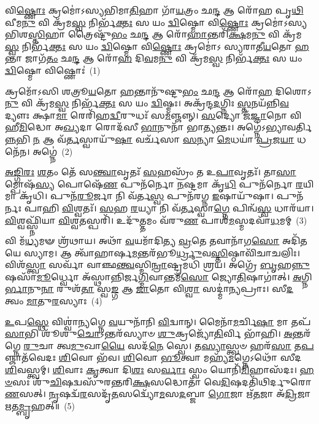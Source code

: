 \setcounter{anuvakam}{0}
𑌵𑌿\-\ul{𑌷𑍍𑌣𑍋𑌃} 𑌕𑍍𑌰𑌮𑍋॑\-𑌽𑌸𑍍𑌯𑌭𑌿𑌮𑌾\-\ul{𑌤𑌿}\-𑌹𑌾 𑌗𑌾᳴\-\ul{𑌯}\-𑌤𑍍𑌰𑌂 𑌛\-\ul{𑌨𑍍𑌦} 𑌆 𑌰𑍋᳴𑌹 𑌪𑍃\-\ul{𑌥𑌿}\-𑌵𑍀𑌮\-\ul{𑌨𑍁} 𑌵𑌿 𑌕𑍍𑌰᳴𑌮\-\ul{𑌸𑍍𑌵} 𑌨𑌿𑌰𑍍𑌭᳴\-\ul{𑌕𑍍𑌤𑌃} 𑌸 𑌯𑌂 \ul{𑌦𑍍𑌵𑌿}\-𑌷𑍍𑌮𑍋 𑌵𑌿\-\ul{𑌷𑍍𑌣𑍋𑌃} 𑌕𑍍𑌰𑌮𑍋॑\-𑌽𑌸𑍍𑌯𑌭𑌿𑌶\-\ul{𑌸𑍍𑌤𑌿}\-𑌹𑌾 𑌤𑍍𑌰𑍈𑌷𑍍𑌟𑍁᳴\-\ul{𑌭𑌂} 𑌛\-\ul{𑌨𑍍𑌦} 𑌆 𑌰𑍋᳴\-\ul{𑌹𑌾}\-𑌨𑍍𑌤𑌰𑌿᳴\-\ul{𑌕𑍍𑌷}\-𑌮\-\ul{𑌨𑍁} 𑌵𑌿 𑌕𑍍𑌰᳴𑌮\-\ul{𑌸𑍍𑌵} 𑌨𑌿𑌰𑍍𑌭᳴\-\ul{𑌕𑍍𑌤𑌃} 𑌸 𑌯𑌂 \ul{𑌦𑍍𑌵𑌿}\-𑌷𑍍𑌮𑍋 𑌵𑌿\-\ul{𑌷𑍍𑌣𑍋𑌃} 𑌕𑍍𑌰𑌮𑍋॑\-𑌽 𑌸𑍍𑌯𑌰𑌾𑌤𑍀\-\ul{𑌯}\-𑌤𑍋 \ul{𑌹}\-𑌨𑍍𑌤𑌾 𑌜𑌾𑌗᳴\-\ul{𑌤𑌂} 𑌛\-\ul{𑌨𑍍𑌦} 𑌆 𑌰𑍋᳴\-\ul{𑌹} 𑌦𑌿\-\ul{𑌵}\-𑌮\-\ul{𑌨𑍁} 𑌵𑌿 𑌕𑍍𑌰᳴𑌮\-\ul{𑌸𑍍𑌵} 𑌨𑌿𑌰𑍍𑌭᳴\-\ul{𑌕𑍍𑌤𑌃} 𑌸 𑌯𑌂 \ul{𑌦𑍍𑌵𑌿}\-𑌷𑍍𑌮𑍋 𑌵𑌿𑌷𑍍𑌣𑍋𑌃॑~(1)

𑌕𑍍𑌰𑌮𑍋᳴\-𑌽𑌸𑌿 𑌶𑌤𑍍𑌰𑍂\-\ul{𑌯}\-𑌤𑍋 \ul{𑌹}\-𑌨𑍍𑌤𑌾𑌨𑍁᳴𑌷𑍍𑌟𑍁\-\ul{𑌭𑌂} 𑌛\-\ul{𑌨𑍍𑌦} 𑌆 𑌰𑍋᳴\-\ul{𑌹} 𑌦𑌿𑌶𑍋\-𑌽\-\ul{𑌨𑍁} 𑌵𑌿 𑌕𑍍𑌰᳴𑌮\-\ul{𑌸𑍍𑌵} 𑌨𑌿𑌰𑍍𑌭᳴\-\ul{𑌕𑍍𑌤𑌃} 𑌸 𑌯𑌂 \ul{𑌦𑍍𑌵𑌿}\-𑌷𑍍𑌮𑌃। 𑌅𑌕𑍍𑌰᳴𑌨𑍍𑌦\-\ul{𑌦}\-𑌗𑍍𑌨𑌿𑌃 \ul{𑌸𑍍𑌤}\-𑌨𑌯᳴𑌨𑍍𑌨𑌿\-\ul{𑌵} 𑌦𑍍𑌯𑍗𑌃 𑌕𑍍𑌷𑌾\-\ul{𑌮𑌾} 𑌰𑍇𑌰𑌿᳴𑌹\-\ul{𑌦𑍍𑌵𑍀}\-𑌰𑍁𑌧𑌃᳴ 𑌸\-\ul{𑌮}\-𑌞𑍍𑌜𑌨𑍍𑌨𑍍। \ul{𑌸}\-𑌦𑍍𑌯𑍋 𑌜᳴\-\ul{𑌜𑍍𑌞𑌾}\-𑌨𑍋 𑌵𑌿 𑌹𑍀\-\ul{𑌮𑌿}\-𑌦𑍍𑌧𑍋 𑌅\-\ul{𑌖𑍍𑌯}\-𑌦𑌾 𑌰𑍋𑌦᳴𑌸𑍀 \ul{𑌭𑌾}\-𑌨𑍁𑌨𑌾᳴ 𑌭𑌾\-\ul{𑌤𑍍𑌯}\-𑌨𑍍𑌤𑌃। 𑌅𑌗𑍍𑌨𑍇॑\-𑌽𑌭𑍍𑌯𑌾𑌵𑌰𑍍𑌤𑌿\-\ul{𑌨𑍍𑌨}\-𑌭𑌿 \ul{𑌨} 𑌆 𑌵᳴\-\ul{𑌰𑍍𑌤}\-𑌸𑍍𑌵𑌾𑌯𑍁᳴\-\ul{𑌷𑌾} 𑌵𑌰𑍍𑌚᳴𑌸𑌾 \ul{𑌸}\-𑌨𑍍𑌯𑌾 \ul{𑌮𑍇}\-𑌧𑌯𑌾॑ \ul{𑌪𑍍𑌰}\-𑌜\-\ul{𑌯𑌾} 𑌧𑌨𑍇᳴𑌨। 𑌅𑌗𑍍𑌨𑍇॑~(2)

\-\ul{𑌅}\-\-\ul{𑌙𑍍𑌗𑌿}\-\-\ul{𑌰𑌃} \ul{𑌶}\-𑌤𑌂 𑌤𑍇᳴ 𑌸\-\ul{𑌨𑍍𑌤𑍍𑌵𑌾}\-𑌵𑍃𑌤𑌃᳴ \ul{𑌸}\-𑌹𑌸𑍍𑌰𑌂᳴ 𑌤 𑌉\-\ul{𑌪𑌾}\-𑌵𑍃𑌤𑌃᳴। 𑌤𑌾\-\ul{𑌸𑌾}\-𑌮𑍍𑌪𑍋𑌷᳴\-\ul{𑌸𑍍𑌯} 𑌪𑍋𑌷𑍇᳴\-\ul{𑌣} 𑌪𑍁𑌨᳴𑌰𑍍𑌨𑍋 \ul{𑌨}\-𑌷𑍍𑌟𑌮𑌾 𑌕𑍃᳴\-\ul{𑌧𑌿} 𑌪𑍁𑌨᳴𑌰𑍍𑌨𑍋 \ul{𑌰}\-𑌯𑌿𑌮𑌾 𑌕𑍃᳴𑌧𑌿। 𑌪𑍁𑌨᳴\-\ul{𑌰𑍂}\-𑌰𑍍𑌜𑌾 𑌨𑌿 𑌵᳴𑌰𑍍𑌤\-\ul{𑌸𑍍𑌵} 𑌪𑍁𑌨᳴𑌰𑌗𑍍𑌨 \ul{𑌇}\-𑌷𑌾𑌯𑍁᳴𑌷𑌾। 𑌪𑍁𑌨᳴𑌰𑍍𑌨𑌃 𑌪𑌾𑌹𑌿 \ul{𑌵𑌿}\-𑌶𑍍𑌵𑌤𑌃᳴। \ul{𑌸}\-𑌹 \ul{𑌰}\-𑌯𑍍𑌯𑌾 𑌨𑌿 𑌵᳴\-\ul{𑌰𑍍𑌤}\-𑌸𑍍𑌵𑌾\-\ul{𑌗𑍍𑌨𑍇} 𑌪𑌿𑌨𑍍𑌵᳴\-\ul{𑌸𑍍𑌵} 𑌧𑌾𑌰᳴𑌯𑌾। \ul{𑌵𑌿}\-𑌶𑍍𑌵𑌫𑍍𑌸𑍍𑌨𑌿᳴𑌯𑌾 \ul{𑌵𑌿}\-𑌶𑍍𑌵\-\ul{𑌤}\-𑌸𑍍𑌪𑌰𑌿᳴। 𑌉𑌦𑍁᳴\-\ul{𑌤𑍍𑌤}\-𑌮𑌂 𑌵᳴𑌰𑍁\-\ul{𑌣} 𑌪𑌾𑌶᳴\-\ul{𑌮}\-𑌸𑍍𑌮𑌦𑌵𑌾᳴\-\ul{𑌧}\-𑌮𑌮𑍍~(3)

𑌵𑌿 𑌮᳴\-\ul{𑌧𑍍𑌯}\-𑌮𑍟 𑌶𑍍𑌰᳴𑌥𑌾𑌯। 𑌅𑌥𑌾᳴ \ul{𑌵}\-𑌯𑌮𑌾᳴𑌦𑌿𑌤𑍍𑌯 \ul{𑌵𑍍𑌰}\-𑌤𑍇 𑌤𑌵𑌾𑌨𑌾᳴𑌗\-\ul{𑌸𑍋} 𑌅𑌦𑌿᳴𑌤𑌯𑍇 𑌸𑍍𑌯𑌾𑌮। 𑌆 𑌤𑍍𑌵𑌾᳴𑌹𑌾𑌰𑍍\mbox{}𑌷\-\ul{𑌮}\-𑌨𑍍𑌤𑌰᳴𑌭𑍂\-\ul{𑌰𑍍𑌧𑍍𑌰𑍁}\-𑌵\-\ul{𑌸𑍍𑌤𑌿}\-𑌷𑍍𑌠𑌾\-𑌵𑌿᳴𑌚𑌾𑌚𑌲𑌿𑌃। 𑌵𑌿𑌶᳴\-\ul{𑌸𑍍𑌤𑍍𑌵𑌾} 𑌸𑌰𑍍𑌵𑌾᳴ 𑌵𑌾𑌞𑍍𑌛\-\ul{𑌨𑍍𑌤𑍍𑌵}\-𑌸𑍍𑌮𑌿\-\ul{𑌨𑍍𑌰𑌾}\-𑌷𑍍𑌟𑍍𑌰𑌮𑌧𑌿᳴ 𑌶𑍍𑌰𑌯। 𑌅𑌗𑍍𑌰𑍇᳴ \ul{𑌬𑍃}\-𑌹\-\ul{𑌨𑍍𑌨𑍁}\-𑌷𑌸𑌾᳴\-\ul{𑌮𑍂}\-𑌰𑍍𑌧𑍍𑌵𑍋 𑌅᳴𑌸𑍍𑌥𑌾𑌨𑍍𑌨𑌿𑌰𑍍𑌜\-\ul{𑌗𑍍𑌮𑌿}\-𑌵𑌾𑌨𑍍𑌤𑌮᳴\-\ul{𑌸𑍋} 𑌜𑍍𑌯𑍋\-\ul{𑌤𑌿}\-𑌷𑌾𑌗𑌾॑𑌤𑍍। \ul{𑌅}\-𑌗𑍍𑌨𑌿\-\ul{𑌰𑍍𑌭𑌾}\-𑌨𑍁\-\ul{𑌨𑌾} 𑌰𑍁𑌶᳴\-\ul{𑌤𑌾} 𑌸𑍍𑌵\-\ul{𑌙𑍍𑌗} 𑌆 \ul{𑌜𑌾}\-𑌤𑍋 𑌵𑌿\-\ul{𑌶𑍍𑌵𑌾} 𑌸𑌦𑍍𑌮𑌾॑𑌨𑍍𑌯𑌪𑍍𑌰𑌾𑌃। 𑌸𑍀\-\ul{𑌦} 𑌤𑍍𑌵𑌂 \ul{𑌮𑌾}\-𑌤𑍁\-\ul{𑌰}\-𑌸𑍍𑌯𑌾𑌃~(4)

\-\ul{𑌉}\-𑌪\-\ul{𑌸𑍍𑌥𑍇} 𑌵𑌿𑌶𑍍𑌵𑌾॑𑌨𑍍𑌯𑌗𑍍𑌨𑍇 \ul{𑌵}\-𑌯𑍁𑌨𑌾᳴𑌨𑌿 \ul{𑌵𑌿}\-𑌦𑍍𑌵𑌾𑌨𑍍। 𑌮𑍈𑌨𑌾᳴\-\ul{𑌮}\-𑌰𑍍𑌚𑌿\-\ul{𑌷𑌾} 𑌮𑌾 𑌤𑌪᳴\-\ul{𑌸𑌾}\-𑌭𑌿 𑌶𑍂᳴𑌶𑍁\-\ul{𑌚𑍋}\-\-𑌽𑌨𑍍𑌤𑌰᳴𑌸𑍍𑌯𑌾𑍞 \ul{𑌶𑍁}\-𑌕𑍍𑌰𑌜𑍍𑌯𑍋᳴\-\ul{𑌤𑌿}\-𑌰𑍍𑌵𑌿 𑌭𑌾᳴𑌹𑌿। \ul{𑌅}\-𑌨𑍍𑌤𑌰᳴𑌗𑍍𑌨𑍇 \ul{𑌰𑍁}\-𑌚𑌾 𑌤𑍍𑌵\-\ul{𑌮𑍁}\-𑌖𑌾\-\ul{𑌯𑍈} 𑌸𑌦᳴\-\ul{𑌨𑍇} 𑌸𑍍𑌵𑍇। 𑌤\-\ul{𑌸𑍍𑌯𑌾}\-𑌸𑍍𑌤𑍍𑌵𑍞 𑌹𑌰᳴\-\ul{𑌸𑌾} 𑌤\-\ul{𑌪}\-𑌞𑍍𑌜𑌾𑌤᳴𑌵𑍇𑌦𑌃 \ul{𑌶𑌿}\-𑌵𑍋 𑌭᳴𑌵। \ul{𑌶𑌿}\-𑌵𑍋 \ul{𑌭𑍂}\-𑌤𑍍𑌵𑌾 𑌮𑌹𑍍𑌯᳴\-\ul{𑌮}\-𑌗𑍍𑌨𑍇\-𑌽𑌥𑍋᳴ 𑌸𑍀𑌦 \ul{𑌶𑌿}\-𑌵𑌸𑍍𑌤𑍍𑌵𑌮𑍍। \ul{𑌶𑌿}\-𑌵𑌾𑌃 \ul{𑌕𑍃}\-𑌤𑍍𑌵𑌾 𑌦𑌿\-\ul{𑌶𑌃} 𑌸\-\ul{𑌰𑍍𑌵𑌾𑌃} 𑌸𑍍𑌵𑌂 𑌯𑍋𑌨𑌿᳴\-\ul{𑌮𑌿}\-𑌹𑌾𑌸᳴𑌦𑌃। \ul{𑌹}\-\-\ul{𑍞}\-𑌸𑌃 𑌶𑍁᳴\-\ul{𑌚𑌿}\-𑌷𑌦𑍍𑌵𑌸𑍁᳴𑌰𑌨𑍍𑌤𑌰𑌿\-\ul{𑌕𑍍𑌷}\-𑌸𑌦𑍍𑌧𑍋𑌤𑌾᳴ 𑌵𑍇\-\ul{𑌦𑌿}\-𑌷𑌦𑌤𑌿᳴𑌥𑌿𑌰𑍍𑌦𑍁𑌰𑍋\-\ul{𑌣}\-𑌸𑌤𑍍। \ul{𑌨𑍃}\-𑌷𑌦𑍍𑌵᳴\-\ul{𑌰}\-𑌸𑌦𑍃᳴\-\ul{𑌤}\-𑌸𑌦𑍍𑌵𑍍𑌯𑍋᳴\-\ul{𑌮}\-𑌸\-\ul{𑌦}\-𑌬𑍍𑌜𑌾 \ul{𑌗𑍋}\-𑌜𑌾 𑌋᳴\-\ul{𑌤}\-𑌜𑌾 𑌅᳴\-\ul{𑌦𑍍𑌰𑌿}\-𑌜𑌾 \ul{𑌋}\-𑌤\-\ul{𑌮𑍍𑌬𑍃}\-𑌹𑌤𑍍॥~(5)

